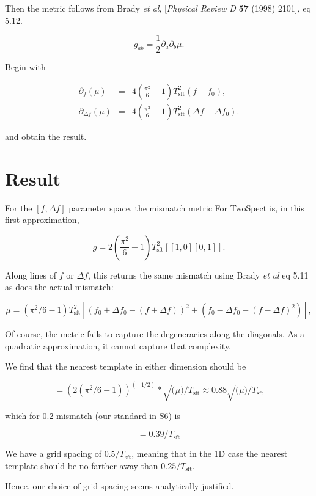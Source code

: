 \documentclass{article}
\begin{document}
\noindent Then the metric follows from
Brady \textit{et al}, [\textit{Physical Review D} \textbf{57} (1998) 2101], eq 5.12.

\begin{equation}
g_{ab} = \frac{1}{2} \partial_a \partial_b \mu.
\end{equation}

\noindent Begin with

\begin{eqnarray}
\partial_f (\mu) &=& 4 \left(\frac{\pi^2}{6} -1\right) T_\mathrm{sft}^2 (f-f_0),\\
\partial_{\Delta f} (\mu) &=& 4 \left(\frac{\pi^2}{6}-1\right) T_\mathrm{sft}^2 (\Delta f - \Delta f_0).
\end{eqnarray}

\noindent and obtain the result.

\section{Result}

For the $[f, \Delta f]$ parameter space, the mismatch metric For TwoSpect is, in this first approximation,

\begin{equation}
  g = 2(\frac{\pi^2}{6} - 1) T_\mathrm{sft}^2  [[1, 0][0, 1]].
\end{equation}

Along lines of $f$ or $\Delta f$, this returns
the same mismatch using Brady \textit{et al} eq 5.11 as does the actual mismatch:

\begin{equation}
\mu = (\pi^2/6 -1) T_\mathrm{sft}^2 
        [(f_0 + \Delta f_0 - (f + \Delta f))^2 + (f_0 - \Delta f_0 - (f - \Delta f)^2) ],
\end{equation}

Of course, the metric
fails to capture the degeneracies along the diagonals.
As a quadratic approximation, it cannot capture that complexity.

We find that the nearest template in either dimension should be

\begin{equation}
[f-f0] = (2 (\pi^2/6 - 1))^(-1/2) * \sqrt(\mu) / T_\mathrm{sft}
       \approx 0.88 \sqrt(\mu) / T_\mathrm{sft}
\end{equation}

\noindent
which for 0.2 mismatch (our standard in S6) is

\begin{equation}
[f-f0] = 0.39/T_\mathrm{sft}
\end{equation}

We have a grid spacing of $0.5/T_\mathrm{sft}$, meaning that in the 1D case the
nearest template should be no farther away than $0.25/T_\mathrm{sft}$.

Hence, our choice of grid-spacing seems analytically justified.
\end{document}

